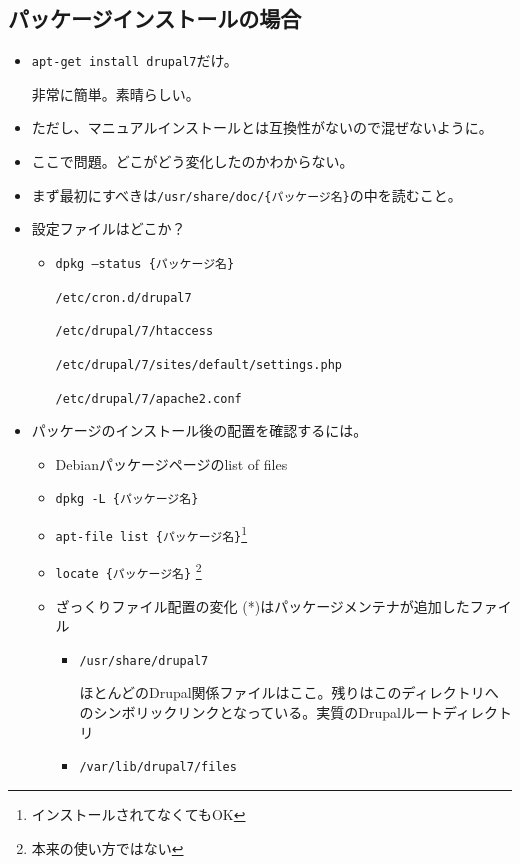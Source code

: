 \documentclass[mingoth,a4paper]{jsarticle}
\begin{document}
\subsection{パッケージインストールの場合}

\begin{itemize}
\item {\tt apt-get install drupal7}だけ。

非常に簡単。素晴らしい。
\item ただし、マニュアルインストールとは互換性がないので混ぜないように。\cite{ubuntudoc}
\item ここで問題。どこがどう変化したのかわからない。
\item まず最初にすべきは{\tt /usr/share/doc/\{パッケージ名\}}の中を読むこと。
\item 設定ファイルはどこか？
  \begin{itemize}
  \item {\tt dpkg --status \{パッケージ名\}}
    \begin{itemize}
      {\tt /etc/cron.d/drupal7}

      {\tt /etc/drupal/7/htaccess}

      {\tt /etc/drupal/7/sites/default/settings.php}

      {\tt /etc/drupal/7/apache2.conf}
    \end{itemize}
  \end{itemize}
\item パッケージのインストール後の配置を確認するには。
  \begin{itemize}
  \item Debianパッケージページのlist of files\cite{filelist}
  \item {\tt dpkg -L \{パッケージ名\}}
  \item {\tt apt-file list \{パッケージ名\}}\footnote{インストールされてなくてもOK}
  \item {\tt locate \{パッケージ名\}} \footnote{本来の使い方ではない}

\clearpage

  \item ざっくりファイル配置の変化 (*)はパッケージメンテナが追加したファイル
    \begin{itemize}
    \item {\tt /usr/share/drupal7}

      ほとんどのDrupal関係ファイルはここ。残りはこのディレクトリへのシンボリックリンクとなっている。実質のDrupalルートディレクトリ

    \item {\tt /var/lib/drupal7/files}


\end{itemize}
\end{itemize}
\end{itemize}
\end{document}

